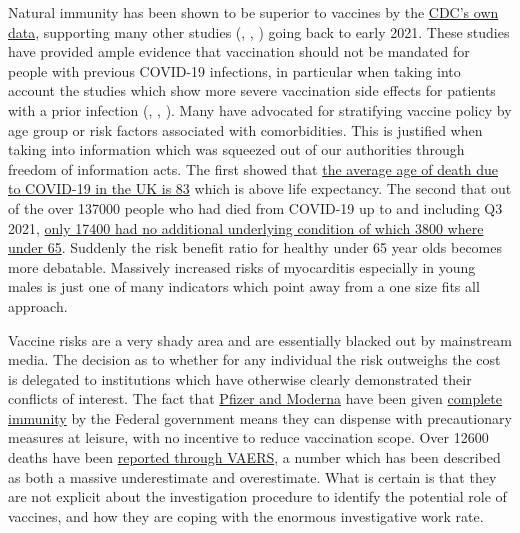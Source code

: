 \documentclass[11pt,a4paper]{article}
\begin{document}
Natural immunity has been shown to be superior to vaccines by the \href{https://www.cdc.gov/mmwr/volumes/71/wr/mm7104e1.htm#F1_down}{CDC's own data}, supporting many other studies (\cite{Gazit2021.08.24.21262415}, \cite{doi:10.1126/science.abf4063}, \cite{Goldberg2021.04.20.21255670}) going back to early 2021. These studies have provided ample evidence that vaccination should not be mandated for people with previous COVID-19 infections, in particular when taking into account the studies which show more severe vaccination side effects for patients with a prior infection (\cite{Monforte2021}, \cite{LI20221082}, \cite{Raw22}). Many have advocated for stratifying vaccine policy by age group or risk factors associated with comorbidities. This is justified when taking into information which was squeezed out of our authorities through freedom of information acts. The first showed that \href{https://www.ons.gov.uk/aboutus/transparencyandgovernance/freedomofinformationfoi/averageageofthosewhohaddiedwithcovid19}{the average age of death due to COVID-19 in the UK is 83} which is above life expectancy. The second that out of the over 137000 people who had died from COVID-19 up to and including Q3 2021, \href{https://www.ons.gov.uk/aboutus/transparencyandgovernance/freedomofinformationfoi/deathsfromcovid19withnootherunderlyingcauses}{only 17400 had no additional underlying condition of which 3800 where under 65}. Suddenly the risk benefit ratio for healthy under 65 year olds becomes more debatable. Massively increased risks of myocarditis especially in young males \cite{10.1001/jama.2021.24110} is just one of many indicators which point away from a one size fits all approach.


Vaccine risks are a very shady area and are essentially blacked out by mainstream media. The decision as to whether for any individual the risk outweighs the cost is delegated to institutions which have otherwise clearly demonstrated their conflicts of interest. The fact that \href{https://www.cnbc.com/2020/12/16/covid-vaccine-side-effects-compensation-lawsuit.html}{Pfizer and Moderna} have been given \href{https://crsreports.congress.gov/product/pdf/LSB/LSB10443}{complete immunity} by the Federal government means they can dispense with precautionary measures at leisure, with no incentive to reduce vaccination scope. Over 12600 deaths have been \href{https://www.cdc.gov/coronavirus/2019-ncov/vaccines/safety/adverse-events.html}{reported through VAERS}, a number which has been described as both a massive underestimate and overestimate. What is certain is that they are not explicit about the investigation procedure to identify the potential role of vaccines, and how they are coping with the enormous investigative work rate. 
\end{document}
